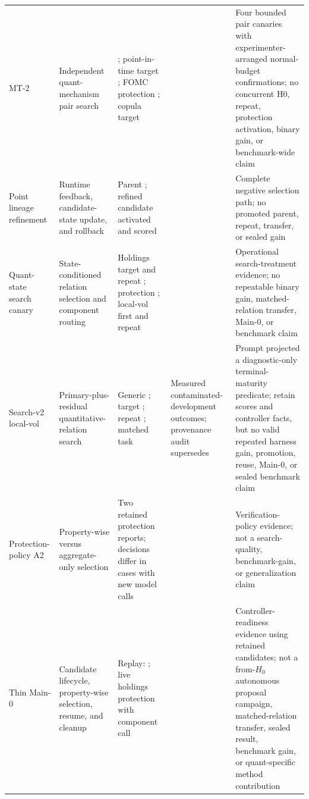 \begin{table}[t]
\begin{tabular}{p{}p{}p{}p{}p{}}
MT-2 & Independent quant-mechanism pair search & \MTTwoDecisions{}; point-in-
time target \MTTwoPointTarget{}; FOMC protection \MTTwoPointProtection{};
copula target \MTTwoCopulaTarget{} & \MTTwoStatus{} & Four bounded pair
canaries with experimenter-arranged normal-budget confirmations; no concurrent
H0, repeat, protection activation, binary gain, or benchmark-wide claim \\

Point lineage refinement & Runtime feedback, candidate-state update, and
rollback & Parent \MTPointLineageParent{}; refined candidate activated and
scored \MTPointLineageCandidate{} & \MTPointLineageStatus{} & Complete negative
selection path; no promoted parent, repeat, transfer, or sealed gain \\

Quant-state search canary & State-conditioned relation selection and component
routing & Holdings target \QStateHoldingsFirst{} and repeat
\QStateHoldingsRepeat{}; protection \QStateHoldingsProtection{}; local-vol
first \QStateLocalFirst{} and repeat \QStateLocalRepeat{} &
\QStateCanaryStatus{} & Operational search-treatment evidence; no repeatable
binary gain, matched-relation transfer, Main-0, or benchmark claim \\

Search-v2 local-vol & Primary-plus-residual quantitative-relation search &
Generic \QStateVTwoGeneric{}; target \QStateVTwoTargetFirst{}; repeat
\QStateVTwoTargetRepeat{}; matched task \QStateVTwoMatched{} &
Measured contaminated-development outcomes; provenance audit supersedes
\QStateVTwoStatus{} & Prompt projected a diagnostic-only terminal-maturity
predicate; retain scores and controller facts, but no valid repeated harness
gain, promotion, reuse, Main-0, or sealed benchmark claim \\

Protection-policy A2 & Property-wise versus aggregate-only selection & Two
retained protection reports; decisions differ in
\ProtectionAblationDisagreements{} cases with \ProtectionAblationNewCalls{}
new model calls & \ProtectionAblationStatus{} & Verification-policy evidence;
not a search-quality, benchmark-gain, or generalization claim \\

Thin Main-0 & Candidate lifecycle, property-wise selection, resume, and cleanup
& Replay: \ThinMainZeroReplay{}; live holdings protection
\ThinMainZeroProtection{} with \ThinMainZeroComponentCalls{} component call &
\ThinMainZeroStatus{} & Controller-readiness evidence using retained candidates;
not a from-$H_0$ autonomous proposal campaign, matched-relation transfer,
sealed result, benchmark gain, or quant-specific method contribution \\


\end{tabular}
\end{table}
